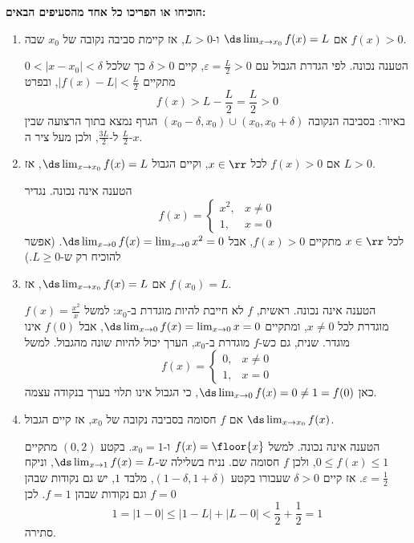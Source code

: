 \textbf{הוכיחו או הפריכו כל אחד מהסעיפים הבאים:}
\begin{enumerate}
\item אם $\ds\lim_{x\to x_0}f(x)=L$ ו-$L>0$, אז קיימת סביבה נקובה של $x_0$ שבה $f(x)>0$.
\ifsol
{}
\begin{solbox}
הטענה נכונה. לפי הגדרת הגבול עם $\varepsilon=\frac L2>0$, קיים $\delta>0$ כך שלכל $0<|x-x_0|<\delta$ מתקיים $|f(x)-L|<\frac L2$, ובפרט
\[f(x)>L-\frac L2=\frac L2>0\]
באיור: בסביבה הנקובה $(x_0-\delta,x_0)\cup(x_0,x_0+\delta)$ הגרף נמצא בתוך הרצועה שבין $\frac L2$ ל-$\frac{3L}{2}$, ולכן מעל ציר ה-$x$.
\end{solbox}
\fi
\item אם $f(x)>0$ לכל $x\in\rr$, וקיים הגבול $\ds\lim_{x\to x_0}f(x)=L$, אז $L>0$.
\ifsol
\begin{solbox}
הטענה אינה נכונה. נגדיר
\[f(x)=\begin{cases}x^2, & x\ne0\\ 1, & x=0\end{cases}\]
לכל $x\in\rr$ מתקיים $f(x)>0$, אבל $\ds\lim_{x\to0}f(x)=\lim_{x\to0}x^2=0$. (אפשר להוכיח רק ש-$L\ge0$.)
\end{solbox}
\fi
\item אם $\ds\lim_{x\to x_0}f(x)=L$, אז $f(x_0)=L$.
\ifsol
\begin{solbox}
הטענה אינה נכונה. ראשית, $f$ לא חייבת להיות מוגדרת ב-$x_0$: למשל $f(x)=\frac{x^2}{x}$ מוגדרת לכל $x\ne0$, ומתקיים $\ds\lim_{x\to0}f(x)=\lim_{x\to0}x=0$, אבל $f(0)$ אינו מוגדר. שנית, גם כש-$f$ מוגדרת ב-$x_0$, הערך יכול להיות שונה מהגבול. למשל
\[f(x)=\begin{cases}0, & x\ne0\\ 1, & x=0\end{cases}\]
כאן $\ds\lim_{x\to0}f(x)=0\ne1=f(0)$, כי הגבול אינו תלוי בערך בנקודה עצמה.
\end{solbox}
\fi
\item אם $f$ חסומה בסביבה נקובה של $x_0$, אז קיים הגבול $\ds\lim_{x\to x_0}f(x)$.
\ifsol
\begin{solbox}
הטענה אינה נכונה. למשל $f(x)=\floor{x}$ ו-$x_0=1$. בקטע $(0,2)$ מתקיים $0\le f(x)\le1$, ולכן $f$ חסומה שם. נניח בשלילה ש-$\ds\lim_{x\to1}f(x)=L$, וניקח $\varepsilon=\frac12$. אז קיים $\delta>0$ שעבורו בקטע $(1-\delta,1+\delta)$, מלבד $1$, יש גם נקודות שבהן $f=0$ וגם נקודות שבהן $f=1$. לכן
\[1=|1-0|\le|1-L|+|L-0|<\frac12+\frac12=1\]
סתירה.
\end{solbox}
\fi
\end{enumerate}
